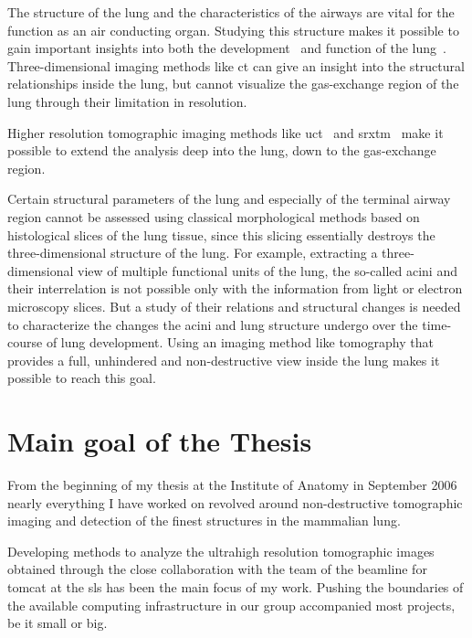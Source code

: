 The structure of the lung and the characteristics of the airways are vital for the function as an air conducting organ. Studying this structure makes it possible to gain important insights into both the development~\cite{Schittny2007a,Hyde2007} and function of the lung~\cite{Tsuda2002}. Three-dimensional imaging methods like \ac{ct} can give an insight into the structural relationships inside the lung, but cannot visualize the gas-exchange region of the lung through their limitation in resolution.

Higher resolution tomographic imaging methods like \ac{uct}~\cite{Hoffman2005} and \ac{srxtm}~\cite{Bayat2006,Bayat2009,Mund2008,Schittny2008,Tsuda2008} make it possible to extend the analysis deep into the lung, down to the gas-exchange region.

Certain structural parameters of the lung and especially of the terminal airway region cannot be assessed using classical morphological methods based on histological slices of the lung tissue, since this slicing essentially destroys the three-dimensional structure of the lung. For example, extracting a three-dimensional view of multiple functional units of the lung, the so-called acini and their interrelation is not possible only with the information from light or electron microscopy slices. But a study of their relations and structural changes is needed to characterize the changes the acini and lung structure undergo over the time-course of lung development. Using an imaging method like tomography that provides a full, unhindered and non-destructive view inside the lung makes it possible to reach this goal.

\section{Main goal of the Thesis}
From the beginning of my thesis at the Institute of Anatomy in September 2006 nearly everything I have worked on revolved around non-destructive tomographic imaging and detection of the finest structures in the mammalian lung.

Developing methods to analyze the ultrahigh resolution tomographic images obtained through the close collaboration with the team of the beamline for \ac{tomcat} at the \ac{sls} has been the main focus of my work. Pushing the boundaries of the available computing infrastructure in our group accompanied most projects, be it small or big.

